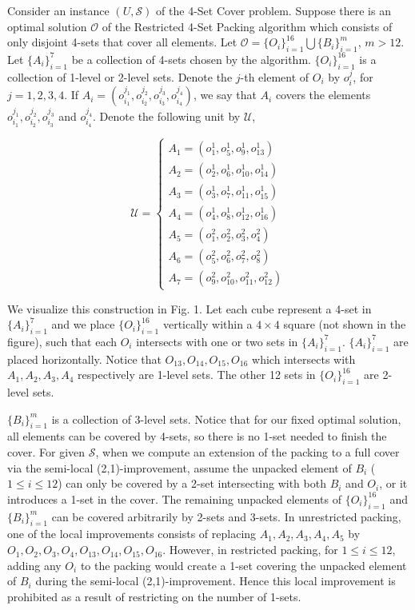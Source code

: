 \documentclass[runningheads,a4paper]{llncs}
\numberwithin{equation}{section}
\begin{document}
\begin{example}[Blocking]
Consider an instance $(U,\mathscr{S})$ of the 4-Set Cover problem. Suppose there is an optimal solution $\mathscr{O}$ of the Restricted 4-Set Packing algorithm which consists of only disjoint 4-sets that cover all elements. Let $\mathscr{O}=\{O_i\}_{i=1}^{16}\bigcup\{B_i\}_{i=1}^m$, $m>12$. Let $\{A_i\}_{i=1}^7$ be a collection of 4-sets chosen by the algorithm. $\{O_i\}_{i=1}^{16}$ is a collection of 1-level or 2-level sets. Denote the $j$-th element of $O_i$ by $o_i^j$, for $j=1,2,3,4$. If $A_i=(o_{i_1}^{j_1},o_{i_2}^{j_2},o_{i_3}^{j_3},o_{i_4}^{j_4})$, we say that $A_i$ covers the elements $o_{i_1}^{j_1},o_{i_2}^{j_2},o_{i_3}^{j_3}$ and $o_{i_4}^{j_4}$. Denote the following unit by $\mathcal{U}$,

\begin{displaymath}
\mathcal{U}=\left\{
  \begin{array}{ll}
    A_1=(o_{1}^{1},o_{5}^{1},o_{9}^{1},o_{13}^{1})\\
    A_2=(o_{2}^{1},o_{6}^{1},o_{10}^{1},o_{14}^{1})\\
    A_3=(o_{3}^{1},o_{7}^{1},o_{11}^{1},o_{15}^{1})\\
    A_4=(o_{4}^{1},o_{8}^{1},o_{12}^{1},o_{16}^{1})\\
    A_5=(o_{1}^{2},o_{2}^{2},o_{3}^{2},o_{4}^{2})\\
    A_6=(o_{5}^{2},o_{6}^{2},o_{7}^{2},o_{8}^{2})\\
    A_7=(o_{9}^{2},o_{10}^{2},o_{11}^{2},o_{12}^{2})
  \end{array}
\right.
\end{displaymath}

We visualize this construction in Fig. 1. Let each cube represent a 4-set in $\{A_i\}_{i=1}^7$ and we place $\{O_i\}_{i=1}^{16}$ vertically within a $4\times 4$ square (not shown in the figure), such that each $O_i$ intersects with one or two sets in $\{A_i\}_{i=1}^{7}$. $\{A_i\}_{i=1}^{7}$ are placed horizontally. Notice that $O_{13},O_{14},O_{15},O_{16}$ which intersects with $A_1,A_2,A_3,A_4$ respectively are 1-level sets. The other 12 sets in $\{O_i\}_{i=1}^{16}$ are 2-level sets.

$\{B_i\}_{i=1}^m$ is a collection of 3-level sets. Notice that for our fixed optimal solution, all elements can be covered by 4-sets, so there is no 1-set needed to finish the cover. For given $\mathscr{S}$, when we compute an extension of the packing to a full cover via the semi-local (2,1)-improvement, assume the unpacked element of $B_i$ ($1\leq i\leq 12$) can only be covered by a 2-set intersecting with both $B_i$ and $O_i$, or it introduces a 1-set in the cover. The remaining unpacked elements of $\{O_i\}_{i=1}^{16}$ and $\{B_i\}_{i=1}^m$ can be covered arbitrarily by 2-sets and 3-sets. In unrestricted packing, one of the local improvements consists of replacing $A_1,A_2,A_3,A_4,A_5$ by $O_1,O_2,O_3,O_4,O_{13},O_{14},O_{15},O_{16}$. However, in restricted packing, for $1\leq i\leq 12$, adding any $O_i$ to the packing would create a 1-set covering the unpacked element of $B_i$ during the semi-local (2,1)-improvement. Hence this local improvement is prohibited as a result of restricting on the number of 1-sets.


\end{example}
\end{document}
